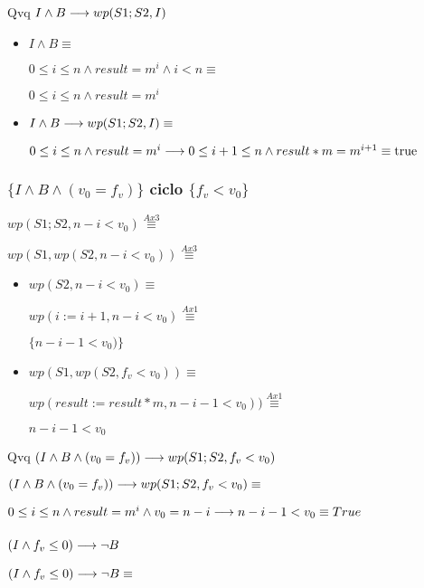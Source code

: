 \documentclass{article}
\begin{document}
Qvq $I \wedge B \longrightarrow wp(S1;S2, I)$

\begin{itemize}
    \item $I \wedge B \equiv$
    
    $0 \leq i \leq n \wedge result = m^{i} \wedge i < n \equiv$

    $0 \leq i \leq n \wedge result = m^{i}$

    \item $I \wedge B \longrightarrow wp(S1;S2, I) \equiv$

    $0 \leq i \leq n \wedge result = m^{i} \longrightarrow 0 \leq i+1 \leq n \wedge result*m = m^{i+1} \equiv \mathrm{true}$
\end{itemize}
    
\subsubsection*{$\{I \wedge B \wedge (v_{0} = f_{v})\}$ ciclo $\{f_{v} < v_{0}\}$}

$wp(S1;S2, n-i<v_{0}) \stackrel{Ax3}{\equiv}$

$wp(S1, wp(S2, n-i<v_{0})) \stackrel{Ax3}{\equiv}$

\begin{itemize}
    \item $wp(S2, n-i<v_{0}) \equiv$
    
    $ wp(i:=i+1, n-i<v_{0}) \stackrel{Ax1}{\equiv}$

    $ \{ n-i-1<v_{0}) \}$

    \item $wp(S1, wp(S2, f_{v} < v_{0})) \equiv$

    $ wp(result:= result * m, n-i-1<v_{0})) \stackrel{Ax1}{\equiv}$

    $ n-i-1<v_{0} $
\end{itemize}

Qvq $(I \wedge B \wedge (v_{0} = f_{v})) \longrightarrow wp(S1;S2, f_{v} < v_{0})$

$(I \wedge B \wedge (v_{0} = f_{v})) \longrightarrow wp(S1;S2, f_{v} < v_{0}) \equiv$

$0 \leq i \leq n \wedge result = m^{i} \wedge v_{0} = n-i \longrightarrow n-i-1<v_{0} \equiv True$

\subsubsection*{$(I \wedge f_{v} \leq 0) \longrightarrow \neg B$}

$(I \wedge f_{v} \leq 0) \longrightarrow \neg B \equiv $
\end{document}
